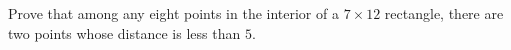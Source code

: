 Prove that among any eight points in the interior of a $7\times12$ rectangle, there are two points whose distance is less than $5$.

